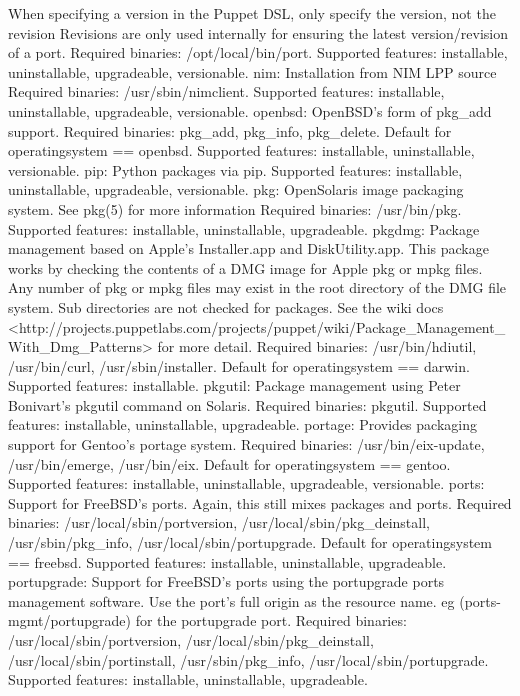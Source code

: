     When specifying a version in the Puppet DSL, only specify the version, not the revision Revisions are only used internally for ensuring the latest version/revision of a port. Required binaries: /opt/local/bin/port. Supported features: installable, uninstallable, upgradeable, versionable.
    nim: Installation from NIM LPP source Required binaries: /usr/sbin/nimclient. Supported features: installable, uninstallable, upgradeable, versionable.
    openbsd: OpenBSD’s form of pkg_add support. Required binaries: pkg_add, pkg_info, pkg_delete. Default for operatingsystem == openbsd. Supported features: installable, uninstallable, versionable.
    pip: Python packages via pip. Supported features: installable, uninstallable, upgradeable, versionable.
    pkg: OpenSolaris image packaging system. See pkg(5) for more information Required binaries: /usr/bin/pkg. Supported features: installable, uninstallable, upgradeable.
    pkgdmg: Package management based on Apple’s Installer.app and DiskUtility.app. This package works by checking the contents of a DMG image for Apple pkg or mpkg files. Any number of pkg or mpkg files may exist in the root directory of the DMG file system. Sub directories are not checked for packages. See the wiki docs <http://projects.puppetlabs.com/projects/puppet/wiki/Package_Management_With_Dmg_Patterns> for more detail. Required binaries: /usr/bin/hdiutil, /usr/bin/curl, /usr/sbin/installer. Default for operatingsystem == darwin. Supported features: installable.
    pkgutil: Package management using Peter Bonivart’s pkgutil command on Solaris. Required binaries: pkgutil. Supported features: installable, uninstallable, upgradeable.
    portage: Provides packaging support for Gentoo’s portage system. Required binaries: /usr/bin/eix-update, /usr/bin/emerge, /usr/bin/eix. Default for operatingsystem == gentoo. Supported features: installable, uninstallable, upgradeable, versionable.
    ports: Support for FreeBSD’s ports. Again, this still mixes packages and ports. Required binaries: /usr/local/sbin/portversion, /usr/local/sbin/pkg_deinstall, /usr/sbin/pkg_info, /usr/local/sbin/portupgrade. Default for operatingsystem == freebsd. Supported features: installable, uninstallable, upgradeable.
    portupgrade: Support for FreeBSD’s ports using the portupgrade ports management software. Use the port’s full origin as the resource name. eg (ports-mgmt/portupgrade) for the portupgrade port. Required binaries: /usr/local/sbin/portversion, /usr/local/sbin/pkg_deinstall, /usr/local/sbin/portinstall, /usr/sbin/pkg_info, /usr/local/sbin/portupgrade. Supported features: installable, uninstallable, upgradeable.
